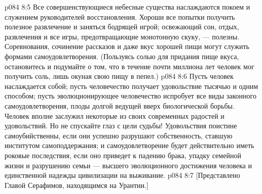 \vs p084 8:5 Все совершенствующиеся небесные существа наслаждаются покоем и служением руководителей восстановления. Хороши все попытки получить полезное развлечение и заняться бодрящей игрой; освежающий сон, отдых, развлечения и все игры, предотвращающие монотонную скуку, --- полезны. Соревнования, сочинение рассказов и даже вкус хорошей пищи могут служить формами самоудовлетворения. (Пользуясь солью для придания пище вкуса, остановитесь и подумайте о том, что в течение почти миллиона лет человек мог получить соль, лишь окуная свою пищу в пепел.)
\vs p084 8:6 \pc Пусть человек наслаждается собой; пусть человечество получает удовольствие тысячью и одним способом; пусть эволюционирующее человечество испробует все виды законного самоудовлетворения, плоды долгой ведущей вверх биологической борьбы. Человек вполне заслужил некоторые из своих современных радостей и удовольствий. Но не спускайте глаз с цели судьбы! Удовольствия поистине самоубийственны, если они успешно разрушают собственность, ставшую институтом самоподдержания; и самоудовлетворение будет действительно иметь роковые последствия, если оно приведет к падению брака, упадку семейной жизни и разрушению семьи --- высшего эволюционного достижения человека и единственной надежды цивилизации на выживание.
\vsetoff
\vs p084 8:7 [Представлено Главой Серафимов, находящимся на Урантии.]
